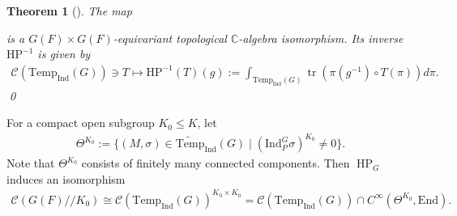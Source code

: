 \documentclass[10pt]{amsart}
\newtheorem{theorem}{Theorem}[section]
\theoremstyle{definition}
\numberwithin{equation}{section}
\DeclareMathOperator{\tr}{\mathrm{tr}}
\numberwithin{equation}{subsection}
\newcommand{\Ind}{\mathrm{Ind}}
\newcommand{\Temp}{\mathrm{Temp}}
\newcommand{\HP}{\mathop{\mathrm{HP}}\nolimits}
\begin{document}
\begin{theorem}[\cite{Waldspurger:Plancherel}]\label{HCPlan} The map 
\begin{center}
\end{center}
is a $G(F)\times G(F)$-equivariant topological $\mathbb{C}$-algebra isomorphism. Its inverse $ \mathrm{HP}^{-1}$ is given by 
\begin{align*}
    \mathcal{C}(\Temp_{\Ind}(G))\ni T\longmapsto \mathrm{HP}^{-1}(T)(g) := \int_{\Temp_{\Ind}(G)} \tr(\pi(g^{-1})\circ T(\pi)) d\pi.
\end{align*}
\qed
\end{theorem}

For a compact open subgroup $K_0\le K$, let 
\begin{align}\label{thetaK0}
    \Theta^{K_0} := \{(M,\sigma)\in\widetilde{\Temp}_\Ind(G)\mid (\Ind_P^G\sigma)^{K_0}\neq 0\}.
\end{align}
Note that $\Theta^{K_0}$ consists of finitely many connected components. Then $\HP_G$ induces an isomorphism  
\begin{align*}\mathcal{C}(G(F)/\!/K_0) \cong \mathcal{C}(\Temp_{\Ind}(G))^{K_0\times K_0}=\mathcal{C}(\Temp_{\Ind}(G))\cap C^\infty(\Theta^{K_0},\mathrm{End}).
\end{align*}
\end{document}
